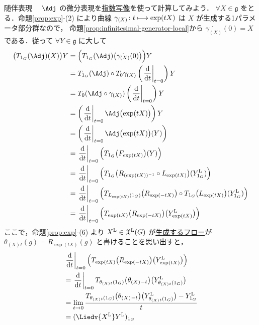 \documentclass[TQFT_main]{subfiles}
\begin{document}
\begin{myexample}[label=def:Lie-adj]{随伴表現}
    　$\Adj$ の微分表現を\hyperref[def:exp]{指数写像}を使って計算してみよう．
    $\forall X \in \mathfrak{g}$ をとる．命題\ref{prop:exp}-(2) により曲線 $\gamma_{(X)} \colon t \longmapsto \exp(tX)$ は $X$ が生成する1パラメータ部分群なので，
    命題\ref{prop:infinitesimal-generator-local}から $\dot{\gamma_{(X)}}(0) = X$ である．従って $\forall Y \in \mathfrak{g}$ に大して
    \begin{align}
        \bigl(T_{1_G}(\Adj) (X)\bigr)Y 
        &= \Bigl( T_{1_G} (\Adj)\bigl(\dot{\gamma_{(X)}}(0)\bigr) \Bigr) Y \\
        &= T_{1_G} (\Adj) \circ T_0 \gamma_{(X)} \left( \eval{\dv{}{t}}_{t=0} \right)  Y \\
        &= T_{0} (\Adj \circ \gamma_{(X)}) \left( \eval{\dv{}{t}}_{t=0}  \right) Y \\
        &= \left(\eval{\dv{}{t}}_{t=0} \Adj \bigl(\exp (tX)\bigr) \right) Y \\
        &= \left(\eval{\dv{}{t}}_{t=0} \Adj \bigl(\exp (tX)\bigr)(Y) \right) \\
        &= \eval{\dv{}{t}}_{t=0} \Bigl(T_{1_G}\bigl( F_{\exp (tX)}  \bigr)(Y) \Bigr) \\
        &= \eval{\dv{}{t}}_{t=0} \Bigl(T_{1_G}\bigl( R_{(\exp (tX))^{-1}} \circ L_{\exp (tX)} \bigr)(\Lie{Y}_{1_G}) \Bigr)\\
        &= \eval{\dv{}{t}}_{t=0} \Bigl(T_{L_{\exp (tX)}(1_G)}\bigl( R_{\exp (-tX)} \bigr) \circ T_{1_G} \bigl( L_{\exp (tX)} \bigr)(\Lie{Y}_{1_G}) \Bigr)\\
        &= \eval{\dv{}{t}}_{t=0} \Bigl(T_{\exp (tX)}\bigl( R_{\exp (-tX)} \bigr) \bigl(\Lie{Y}_{\exp (tX)}\bigr) \Bigr)
    \end{align}
    ここで，命題\ref{prop:exp}-(6) より $X^{\mathrm{L}} \in \mathfrak{X}^{\mathrm{L}}(G)$ が\hyperref[thm:fundamental-flow]{生成するフロー}が $\theta_{(X)}{}_t (g) = R_{\exp(tX)} (g)$ と書けることを思い出すと，
    \begin{align}
        &\eval{\dv{}{t}}_{t=0} \Bigl(T_{\exp (tX)}\bigl( R_{\exp (-tX)} \bigr) \bigl(\Lie{Y}_{\exp (tX)}\bigr) \Bigr) \\
        &= \eval{\dv{}{t}}_{t=0} T_{\theta_{(X)}{}_t(1_G)} \bigl(\theta_{(X)}{}_{-t}\bigr) \bigl( \Lie{Y}_{\theta_{(X)}{}_t (1_G)} \bigr) \\
        &= \lim_{t \to 0} \frac{T_{\theta_{(X)}{}_t(1_G)} \bigl(\theta_{(X)}{}_{-t}\bigr) \bigl( \Lie{Y}_{\theta_{(X)}{}_t (1_G)} \bigr) - \Lie{Y}_{1_G}}{t} \\
        &= (\Liedv{\Lie{X}} \Lie{Y})_{1_G} \\

\end{align}
\end{myexample}
\end{document}
